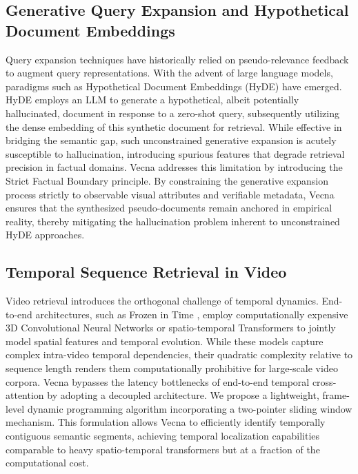 \subsection{Generative Query Expansion and Hypothetical Document Embeddings}
Query expansion techniques have historically relied on pseudo-relevance feedback to augment query representations. With the advent of large language models, paradigms such as Hypothetical Document Embeddings (HyDE) \cite{gao2023precise} have emerged. HyDE employs an LLM to generate a hypothetical, albeit potentially hallucinated, document in response to a zero-shot query, subsequently utilizing the dense embedding of this synthetic document for retrieval. While effective in bridging the semantic gap, such unconstrained generative expansion is acutely susceptible to hallucination, introducing spurious features that degrade retrieval precision in factual domains. Vecna addresses this limitation by introducing the Strict Factual Boundary principle. By constraining the generative expansion process strictly to observable visual attributes and verifiable metadata, Vecna ensures that the synthesized pseudo-documents remain anchored in empirical reality, thereby mitigating the hallucination problem inherent to unconstrained HyDE approaches.

\subsection{Temporal Sequence Retrieval in Video}
Video retrieval introduces the orthogonal challenge of temporal dynamics. End-to-end architectures, such as Frozen in Time \cite{bain2021frozen}, employ computationally expensive 3D Convolutional Neural Networks or spatio-temporal Transformers to jointly model spatial features and temporal evolution. While these models capture complex intra-video temporal dependencies, their quadratic complexity relative to sequence length renders them computationally prohibitive for large-scale video corpora. Vecna bypasses the latency bottlenecks of end-to-end temporal cross-attention by adopting a decoupled architecture. We propose a lightweight, frame-level dynamic programming algorithm incorporating a two-pointer sliding window mechanism. This formulation allows Vecna to efficiently identify temporally contiguous semantic segments, achieving temporal localization capabilities comparable to heavy spatio-temporal transformers but at a fraction of the computational cost.
